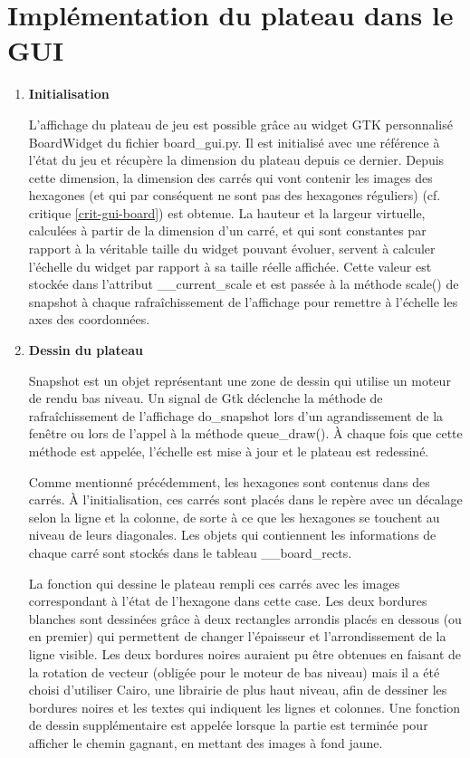 \documentclass[12pt]{article}
\begin{document}
\section{Implémentation du plateau dans le GUI} \label{annexe-gui-board}
\begin{enumerate}

\item \textbf{Initialisation}

L’affichage du plateau de jeu est possible grâce au widget GTK personnalisé BoardWidget du fichier board\_gui.py. Il est initialisé avec une référence à l’état du jeu et récupère la dimension du plateau depuis ce dernier. Depuis cette dimension, la dimension des carrés qui vont contenir les images des hexagones (et qui par conséquent ne sont pas des hexagones réguliers) (cf. critique \ref{crit-gui-board}) est obtenue. La hauteur et la largeur virtuelle, calculées à partir de la dimension d’un carré, et qui sont constantes par rapport à la véritable taille du widget pouvant évoluer, servent à calculer l’échelle du widget par rapport à sa taille réelle affichée. Cette valeur est stockée dans l’attribut \_\_current\_scale et est passée à la méthode scale() de snapshot à chaque rafraîchissement de l’affichage pour remettre à l’échelle les axes des coordonnées.

\bigskip
\item \textbf{Dessin du plateau}

Snapshot est un objet représentant une zone de dessin qui utilise un moteur de rendu bas niveau. Un signal de Gtk déclenche la méthode de rafraîchissement de l’affichage do\_snapshot lors d’un agrandissement de la fenêtre ou lors de l’appel à la méthode queue\_draw(). À chaque fois que cette méthode est appelée, l’échelle est mise à jour et le plateau est redessiné.

\bigskip
Comme mentionné précédemment, les hexagones sont contenus dans des carrés. À l’initialisation, ces carrés sont placés dans le repère avec un décalage selon la ligne et la colonne, de sorte à ce que les hexagones se touchent au niveau de leurs diagonales. Les objets qui contiennent les informations de chaque carré sont stockés dans le tableau \_\_board\_rects. 

\bigskip
La fonction qui dessine le plateau rempli ces carrés avec les images correspondant à l’état de l’hexagone dans cette case. Les deux bordures blanches sont dessinées grâce à deux rectangles arrondis placés en dessous (ou en premier) qui permettent de changer l’épaisseur et l’arrondissement de la ligne visible. Les deux bordures noires auraient pu être obtenues en faisant de la rotation de vecteur (obligée pour le moteur de bas niveau) mais il a été choisi d’utiliser Cairo, une librairie de plus haut niveau, afin de dessiner les bordures noires et les textes qui indiquent les lignes et colonnes. Une fonction de dessin supplémentaire est appelée lorsque la partie est terminée pour afficher le chemin gagnant, en mettant des images à fond jaune.


\end{enumerate}
\end{document}
